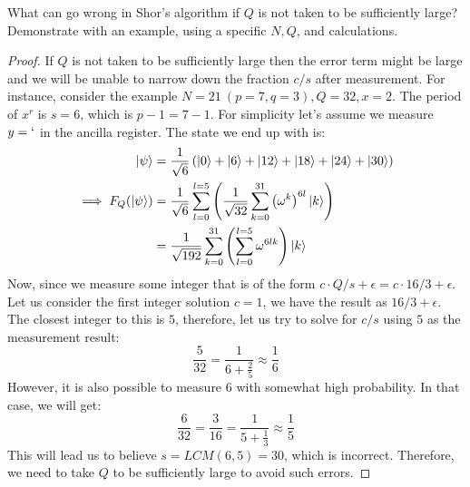 \begin{solution}[label=ques:1a]
  \begin{question}
    What can go wrong in Shor's algorithm if $Q$ is not taken to be
sufficiently large?  Demonstrate with an example, using a specific $N, Q$, and calculations.
  \end{question}
  \tcblower{}
  \begin{proof}
    If $Q$ is not taken to be sufficiently large then the error term might be large and we will be unable to narrow down the fraction $c/s$ after measurement. For instance, consider the example $N = 21\ (p = 7, q = 3), Q = 32, x = 2$. The period of $x^r$ is $s = 6$, which is $p - 1 = 7 - 1$. For simplicity let's assume we measure $y = `$ in the ancilla register. The state we end up with is:
    \begin{equation}
      \begin{split}
        \ket{\psi} &= \frac{1}{\sqrt{6}}\left(\ket{0} + \ket{6} + \ket{12} + \ket{18} + \ket{24} + \ket{30}\right)\\
        \implies F_Q(\ket{\psi}) &= \frac{1}{\sqrt{6}}\sum_{l=0}^{l=5}\left(\frac{1}{\sqrt{32}}\sum_{k=0}^{31}{\left(\omega^k\right)}^{6l}\ket{k}\right)\\
        &= \frac{1}{\sqrt{192}}\sum_{k=0}^{31}\left(\sum_{l=0}^{l=5}\omega^{6lk}\right)\ket{k}\\
      \end{split}
      \label{eq:smolQ}
    \end{equation}
    Now, since we measure some integer that is of the form $c\cdot Q / s + \epsilon = c\cdot 16 / 3 + \epsilon$. Let us consider the first integer solution $c = 1$, we have the result as $16 / 3 + \epsilon$. The closest integer to this is $5$, therefore, let us try to solve for $c/s$ using $5$ as the measurement result:
    \begin{equation}
      \frac{5}{32} = \frac{1}{6 + \frac{2}{5}} \approx \frac{1}{6}
      \label{eq:solvesmolQ}
    \end{equation}
    However, it is also possible to measure $6$ with somewhat high probability. In that case, we will get:
    \begin{equation}
      \frac{6}{32} = \frac{3}{16} = \frac{1}{5 + \frac{1}{3}} \approx \frac{1}{5}
      \label{eq:solvesmolQ2}
    \end{equation}
    This will lead us to believe $s = LCM(6, 5) = 30$, which is incorrect. Therefore, we need to take $Q$ to be sufficiently large to avoid such errors.
  \end{proof}
\end{solution}

